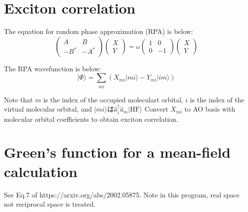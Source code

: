 \documentclass{article}
\begin{document}
\section{Exciton correlation}
The equation for random phase approximation (RPA) is below:
\begin{equation}
\begin{pmatrix}
A & B \\
-B^* & -A^*
\end{pmatrix}
\begin{pmatrix}
X \\
Y
\end{pmatrix}
= \omega
\begin{pmatrix}
1 & 0 \\
0 & -1
\end{pmatrix}
\begin{pmatrix}
X \\
Y
\end{pmatrix}
\end{equation}

The RPA wavefunction is below:
\begin{equation}
|\Phi \rangle = \sum_{mi} (X_{mi}|mi\rangle - Y_{mi}|im\rangle)
\end{equation}

Note that $m$ is the index of the occupied moleculart orbital, $i$ is the index of the virtual molecular orbital,
and $|mi\rangle$は$\hat{a}^{\dagger}_{i}\hat{a}_{m}|\mathrm{HF}\rangle$
Convert $X_{mi}$ to AO basis with molecular orbital coefficients to obtain exciton correlation.

\section{Green's function for a mean-field calculation}
 See Eq.7 of https://arxiv.org/abs/2002.05875.
 Note in this program, real space not reciprocal space is treated.
\end{document}
